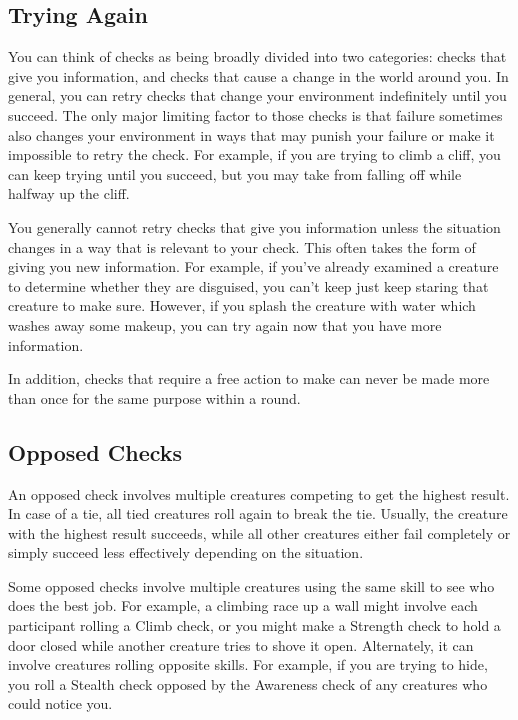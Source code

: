   \subsection{Trying Again}
    You can think of checks as being broadly divided into two categories: checks that give you information, and checks that cause a change in the world around you.
    In general, you can retry checks that change your environment indefinitely until you succeed.
    The only major limiting factor to those checks is that failure sometimes also changes your environment in ways that may punish your failure or make it impossible to retry the check.
    For example, if you are trying to climb a cliff, you can keep trying until you succeed, but you may take  from falling off while halfway up the cliff.

    You generally cannot retry checks that give you information unless the situation changes in a way that is relevant to your check.
    This often takes the form of giving you new information.
    For example, if you've already examined a creature to determine whether they are disguised, you can't keep just keep staring that creature to make sure.
    However, if you splash the creature with water which washes away some makeup, you can try again now that you have more information.

    In addition, checks that require a free action to make can never be made more than once for the same purpose within a round.

  \subsection{Opposed Checks}
    An opposed check involves multiple creatures competing to get the highest result.
    In case of a tie, all tied creatures roll again to break the tie.
    Usually, the creature with the highest result succeeds, while all other creatures either fail completely or simply succeed less effectively depending on the situation.

    Some opposed checks involve multiple creatures using the same skill to see who does the best job.
    For example, a climbing race up a wall might involve each participant rolling a Climb check, or you might make a Strength check to hold a door closed while another creature tries to shove it open.
    Alternately, it can involve creatures rolling opposite skills.
    For example, if you are trying to hide, you roll a Stealth check opposed by the Awareness check of any creatures who could notice you.

